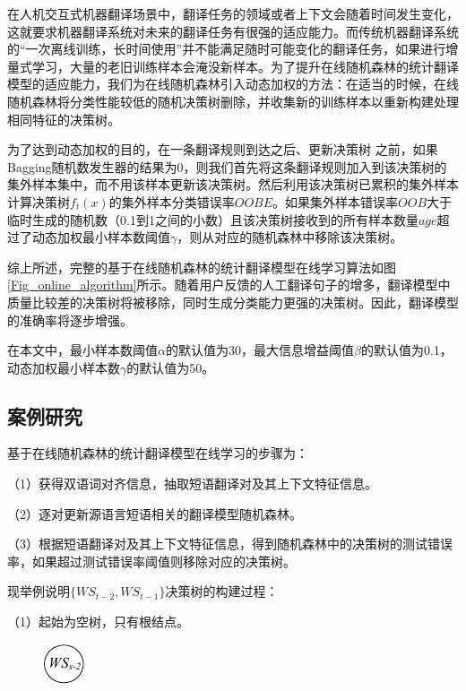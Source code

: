 在人机交互式机器翻译场景中，翻译任务的领域或者上下文会随着时间发生变化，这就要求机器翻译系统对未来的翻译任务有很强的适应能力。而传统机器翻译系统的“一次离线训练，长时间使用”并不能满足随时可能变化的翻译任务，如果进行增量式学习，大量的老旧训练样本会淹没新样本。为了提升在线随机森林的统计翻译模型的适应能力，我们为在线随机森林引入动态加权的方法：在适当的时候，在线随机森林将分类性能较低的随机决策树删除，并收集新的训练样本以重新构建处理相同特征的决策树。

为了达到动态加权的目的，在一条翻译规则到达之后、更新决策树 之前，如果Bagging随机数发生器的结果为0，则我们首先将这条翻译规则加入到该决策树的集外样本集中，而不用该样本更新该决策树。然后利用该决策树已累积的集外样本计算决策树$f_t(x)$的集外样本分类错误率$OOBE$。如果集外样本错误率$OOB$大于临时生成的随机数（0.1到1之间的小数）且该决策树接收到的所有样本数量$age$超过了动态加权最小样本数阈值$\gamma$，则从对应的随机森林中移除该决策树。

综上所述，完整的基于在线随机森林的统计翻译模型在线学习算法如图\ref{Fig_online_algorithm}所示。随着用户反馈的人工翻译句子的增多，翻译模型中质量比较差的决策树将被移除，同时生成分类能力更强的决策树。因此，翻译模型的准确率将逐步增强。

在本文中，最小样本数阈值$\alpha$的默认值为30，最大信息增益阈值$\beta$的默认值为0.1，动态加权最小样本数$\gamma$的默认值为50。

\subsection{案例研究}

基于在线随机森林的统计翻译模型在线学习的步骤为：

（1）获得双语词对齐信息，抽取短语翻译对及其上下文特征信息。

（2）逐对更新源语言短语相关的翻译模型随机森林。

（3）根据短语翻译对及其上下文特征信息，得到随机森林中的决策树的测试错误率，如果超过测试错误率阈值则移除对应的决策树。

现举例说明$\{WS_{t-2},WS_{t-1}\}$决策树的构建过程：

（1）起始为空树，只有根结点。

\begin{figure}[!h]
	\centering
	\includegraphics{Figure/Figure_5_0_1.pdf}
\end{figure}

